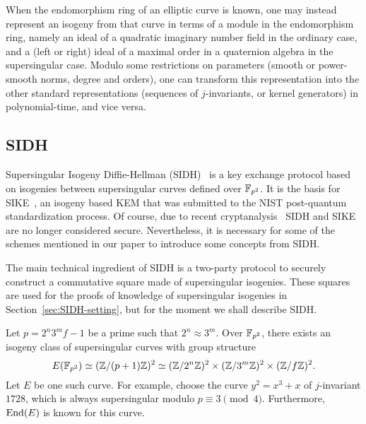 When the endomorphism ring of an elliptic curve is known, one may instead represent an isogeny from that curve in terms of a module in the endomorphism ring, namely an ideal of a quadratic imaginary number field in the ordinary case, and a (left or right) ideal of a maximal order in a quaternion algebra in the supersingular case.
%
Modulo some restrictions on parameters (smooth or power-smooth norms, degree and orders), one can transform this representation into the other standard representations (sequences of $j$-invariants, or kernel generators) in polynomial-time, and vice versa.







\subsection{SIDH}\label{sec:SIDH}

Supersingular Isogeny Diffie-Hellman (SIDH)~\cite{JDF11,DFJP14} is a key exchange protocol based on isogenies between supersingular curves defined over $\mathbb{F}_{p^2}$.
It is the basis for SIKE~\cite{sike2017}, an isogeny based KEM that was submitted to the NIST post-quantum standardization process.
Of course, due to recent cryptanalysis~\cite{CD22,MM22,Rob22} SIDH and SIKE are no longer considered secure.
Nevertheless, it is necessary for some of the schemes mentioned in our paper to introduce some concepts from SIDH.


The main technical ingredient of SIDH is a two-party protocol to securely construct a commutative square made of supersingular isogenies.
These squares are used for the proofs of knowledge of supersingular isogenies in Section~\ref{sec:SIDH-setting}, but for the moment we shall describe SIDH.

Let $p = 2^{n}  3^{m} f - 1 $ be a prime such that $2^{n} \approx 3^{m}$.
Over $\mathbb{F}_{p^2}$, there exists an isogeny class of supersingular curves with group structure
\[
   E(\mathbb{F}_{p^2}) \simeq (\mathbb{Z} /(p + 1)\mathbb{Z})^2 \simeq (\mathbb{Z} /2^n\mathbb{Z})^2 \times (\mathbb{Z} / 3^m \mathbb{Z})^2 \times (\mathbb{Z} / f \mathbb{Z})^2.
\]
Let $E$ be one such curve. For example, choose the curve $y^2 = x^3 + x$ of $j$-invariant $1728$, which is always supersingular modulo  $p \equiv 3 \pmod{4}$. Furthermore, $\text{End}(E)$ is known for this curve.

